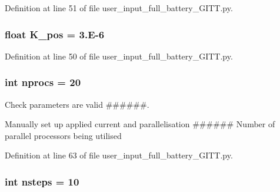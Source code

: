 Definition at line 51 of file user\-\_\-input\-\_\-full\-\_\-battery\-\_\-\-G\-I\-T\-T.\-py.

\hypertarget{namespaceuser__input__full__battery___g_i_t_t_ab1a8ebec490ba1301f818bd1c5f1f3fa}{
\subsubsection[{K\-\_\-pos}]{\setlength{\rightskip}{0pt plus 5cm}float K\-\_\-pos = 3.\-E-\/6}}\label{namespaceuser__input__full__battery___g_i_t_t_ab1a8ebec490ba1301f818bd1c5f1f3fa}


Definition at line 50 of file user\-\_\-input\-\_\-full\-\_\-battery\-\_\-\-G\-I\-T\-T.\-py.

\hypertarget{namespaceuser__input__full__battery___g_i_t_t_ad7c4c17cf720ee538e27c02ab356ed6b}{
\subsubsection[{nprocs}]{\setlength{\rightskip}{0pt plus 5cm}int nprocs = 20}}\label{namespaceuser__input__full__battery___g_i_t_t_ad7c4c17cf720ee538e27c02ab356ed6b}


Check parameters are valid \#\#\#\#\#\#. 

Manually set up applied current and parallelisation \#\#\#\#\#\# Number of parallel processors being utilised 

Definition at line 63 of file user\-\_\-input\-\_\-full\-\_\-battery\-\_\-\-G\-I\-T\-T.\-py.

\hypertarget{namespaceuser__input__full__battery___g_i_t_t_aa2414080b021dbb9b56eeaeedec0ffa2}{
\subsubsection[{nsteps}]{\setlength{\rightskip}{0pt plus 5cm}int nsteps = 10}}\label{namespaceuser__input__full__battery___g_i_t_t_aa2414080b021dbb9b56eeaeedec0ffa2}


